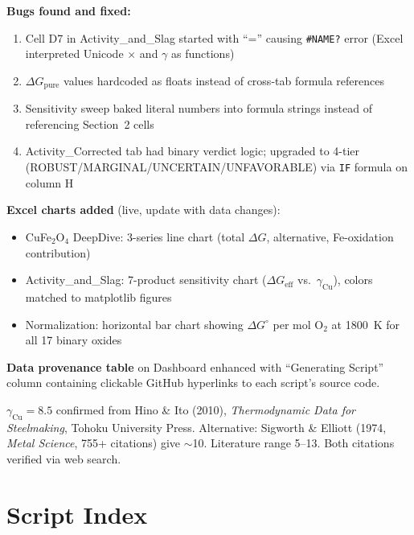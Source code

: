 \documentclass[11pt]{article}
\begin{document}
\textbf{Bugs found and fixed:}
\begin{enumerate}[leftmargin=*]
    \item Cell D7 in Activity\_and\_Slag started with ``='' causing \texttt{\#NAME?} error (Excel interpreted Unicode $\times$ and $\gamma$ as functions)
    \item $\Delta G_{\text{pure}}$ values hardcoded as floats instead of cross-tab formula references
    \item Sensitivity sweep baked literal numbers into formula strings instead of referencing Section~2 cells
    \item Activity\_Corrected tab had binary verdict logic; upgraded to 4-tier (ROBUST/MARGINAL/UNCERTAIN/UNFAVORABLE) via \texttt{IF} formula on column H
\end{enumerate}

\textbf{Excel charts added} (live, update with data changes):
\begin{itemize}[leftmargin=*]
    \item CuFe$_2$O$_4$ DeepDive: 3-series line chart (total $\Delta G$, alternative, Fe-oxidation contribution)
    \item Activity\_and\_Slag: 7-product sensitivity chart ($\Delta G_{\text{eff}}$ vs.\ $\gamma_{\text{Cu}}$), colors matched to matplotlib figures
    \item Normalization: horizontal bar chart showing $\Delta G^\circ$ per mol O$_2$ at \SI{1800}{\kelvin} for all 17 binary oxides
\end{itemize}

\textbf{Data provenance table} on Dashboard enhanced with ``Generating Script'' column containing clickable GitHub hyperlinks to each script's source code.

\begin{insight}
$\gamma_{\text{Cu}} = 8.5$ confirmed from Hino \& Ito (2010), \textit{Thermodynamic Data for Steelmaking}, Tohoku University Press. Alternative: Sigworth \& Elliott (1974, \textit{Metal Science}, 755+ citations) give $\sim$10. Literature range 5--13. Both citations verified via web search.
\end{insight}


\newpage
\section{Script Index}
\label{sec:script_index}
\end{document}
